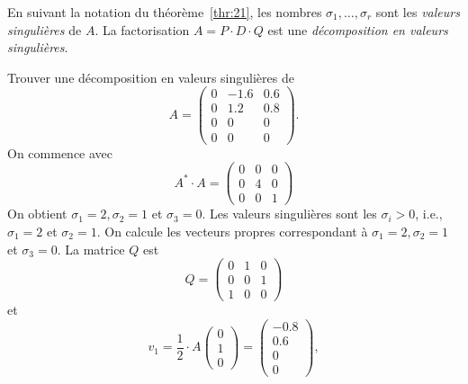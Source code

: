 \begin{definition}
  \label{def:24}
  En suivant la notation du théorème~\ref{thr:21}, 
  les nombres $\sigma_1,\dots,\sigma_r$ sont les \emph{valeurs singulières} de $A$. La factorisation $A = P\cdot D \cdot Q$ est une \emph{décomposition en valeurs singulières}. 
\end{definition}




\begin{example}
  \label{exe:19}
  Trouver une décomposition en valeurs singulières de 
  \begin{displaymath}
    A =
    \begin{pmatrix}
      0 & -1.6  & 0.6 \\
      0 & 1.2 & 0.8 \\
      0 & 0 & 0 \\
      0 & 0 & 0
    \end{pmatrix}. 
  \end{displaymath}
On commence avec 
\begin{displaymath}
  A^* \cdot A =
  \begin{pmatrix}
    0 & 0 & 0 \\
    0 & 4 & 0 \\
    0 & 0 & 1
  \end{pmatrix}
\end{displaymath}
On obtient $\sigma_1 = 2, \sigma_2 = 1$ et $\sigma_3 = 0$. Les valeurs singulières sont les $\sigma_i>0$, i.e., $\sigma_1=2$ et $\sigma_2=1$. On calcule les vecteurs propres correspondant à $\sigma_1 = 2, \sigma_2 = 1$ et $\sigma_3 = 0$. La matrice $Q$ est 
\begin{displaymath}
  Q =
  \begin{pmatrix}
    0 & 1 & 0 \\
    0 & 0 & 1  \\
    1 & 0 & 0  
  \end{pmatrix}
\end{displaymath}
et
\begin{displaymath}
v_1 = \frac{1}{2} \cdot   A 
  \begin{pmatrix}
    0\\1\\0
  \end{pmatrix} =
  \begin{pmatrix}
    -0.8 \\ 0.6 \\ 0 \\ 0
  \end{pmatrix}, 

\end{displaymath}
\end{example}
